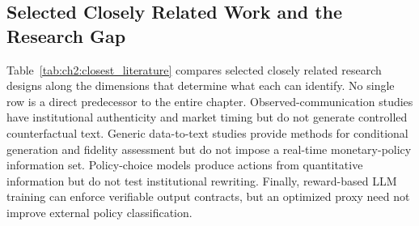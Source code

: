 \subsection{Selected Closely Related Work and the Research Gap}
\label{ch2:sec:lr:gap}

Table~\ref{tab:ch2:closest_literature} compares selected closely related
research designs
along the dimensions that determine what each can identify. No single row is
a direct predecessor to the entire chapter. Observed-communication studies
have institutional authenticity and market timing but do not generate
controlled counterfactual text. Generic data-to-text studies provide methods
for conditional generation and fidelity assessment but do not impose a
real-time monetary-policy information set. Policy-choice models produce
actions from quantitative information but do not test institutional rewriting.
Finally, reward-based LLM training can enforce verifiable output contracts,
but an optimized proxy need not improve external policy classification.

